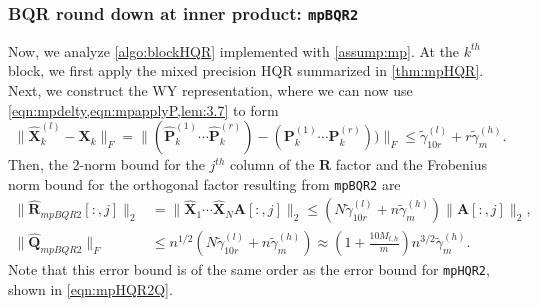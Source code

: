 \documentclass[review,onefignum,onetabnum]{siamart190516}
\newcommand{\bb}[1]{\mathbf{#1}}
\begin{document}
\subsubsection{BQR round down at inner product: {\tt mpBQR2}}
Now, we analyze \cref{algo:blockHQR} implemented with \cref{assump:mp}. 
At the $k^{th}$ block, we first apply the mixed precision HQR summarized in \cref{thm:mpHQR}.
Next, we construct the WY representation, where we can now use \cref{eqn:mpdelty,eqn:mpapplyP,lem:3.7} to form
\begin{equation}
\|\hat{\bb{X}}_{k}^{(l)}- \bb{X}_k\|_F = \|(\hat{\bb{P}}_k^{(1)}\cdots \hat{\bb{P}}_k^{(r)})-(\bb{P}_k^{(1)}\cdots \bb{P}_k^{(r)}))\|_F \leq \tilde{\gamma}_{10r}^{(l)} + r\tilde{\gamma}_{m}^{(h)}.
\end{equation}
Then, the 2-norm bound for the $j^{th}$ column of the $\bb{R}$ factor and the Frobenius norm bound for the orthogonal factor resulting from {\tt mpBQR2} are
\begin{align}
\|\hat{\bb{R}}_{mpBQR2}[:,j]\|_2 &= \|\hat{\bb{X}}_1\cdots\hat{\bb{X}}_N\bb{A}[:,j]\|_2\leq\left( N\tilde{\gamma}_{10r}^{(l)} + n\tilde{\gamma}_{m}^{(h)}\right)\|\bb{A}[:,j]\|_2,\\
\|\hat{\bb{Q}}_{mpBQR2}\|_F &\leq n^{1/2}\left(N\tilde{\gamma}_{10r}^{(l)} + n\tilde{\gamma}_{m}^{(h)}\right) \approx \left(1+\frac{10M_{l,h}}{m}\right)n^{3/2}\tilde{\gamma}_{m}^{(h)}. \label{eqn:mpBQR2}
\end{align}
Note that this error bound is of the same order as the error bound for {\tt mpHQR2}, shown in \cref{eqn:mpHQR2Q}.
\end{document}
